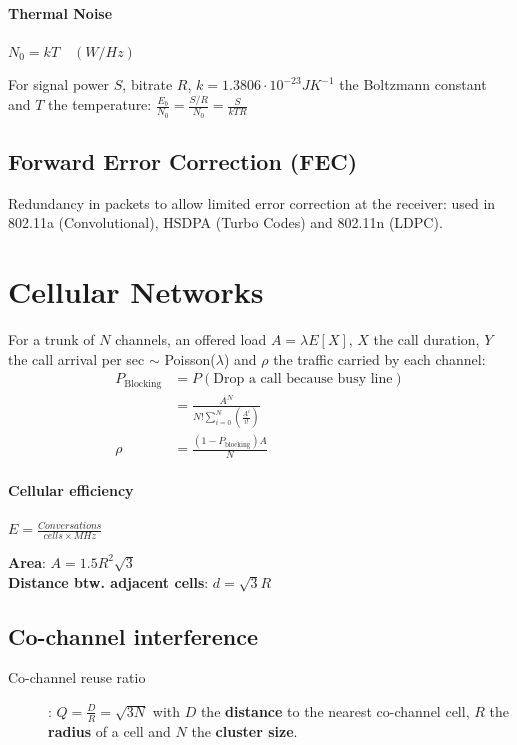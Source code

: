 \documentclass[6pt]{scrartcl}
\begin{document}
\begin{multicols}{4}
\paragraph{Thermal Noise}$N_0 = kT\quad(W/Hz)$

For signal power $S$, bitrate $R$, $k = 1.3806\cdot10^{-23} JK^{-1}$ the Boltzmann constant and $T$ the temperature: $\frac{E_b}{N_0} = \frac{S/R}{N_0} = \frac{S}{kTR}$

\subsection{Forward Error Correction (FEC)}
Redundancy in packets to allow limited error correction at the receiver: used in 802.11a (Convolutional), HSDPA (Turbo Codes) and 802.11n (LDPC).


\section{Cellular Networks}
For a trunk of $N$ channels, an offered load $A=\lambda E[X]$, $X$ the call duration, $Y$ the call arrival per sec $\sim$ Poisson($\lambda$) and $\rho$ the traffic carried by each channel: 
\begin{align*}
	P_\textrm{Blocking} &= P(\textrm{Drop a call because busy line})  \\
	&= \frac{A^N}{N!\sum^N_{i=0}(\frac{A^i}{i!})}\\
	\rho &= \frac{(1 - P_\textrm{blocking})A}{N}
\end{align*}


\paragraph{Cellular efficiency} $E = \frac{Conversations}{cells\times MHz}$


\textbf{Area}: $A=1.5R^2\sqrt{3}$\\
\textbf{Distance btw. adjacent cells}: $d=\sqrt{3}R$

\subsection{Co-channel interference}
\begin{description}
\item[Co-channel reuse ratio]: $Q = \frac{D}{R} = \sqrt{3N}$ with $D$ the \textbf{distance} to the nearest co-channel cell, $R$ the \textbf{radius} of a cell and $N$ the \textbf{cluster size}.


\end{description}
\end{multicols}
\end{document}
